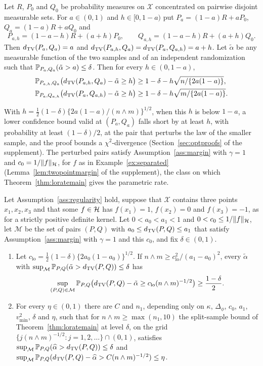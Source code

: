 \begin{proposition}
\label{prop:lower2pt}
Let $R$, $P_0$ and $Q_0$ be probability measures on $\mathcal X$ concentrated on pairwise disjoint measurable sets.
For $a\in(0,1)$ and $h\in[0,1-a)$ put $P_a=(1-a)R+aP_0$, $Q_a=(1-a)R+aQ_0$ and
\[
P_{a,h}=(1-a-h)R+(a+h)P_0,\qquad Q_{a,h}=(1-a-h)R+(a+h)Q_0 .
\]
Then $d_{\mathrm{TV}}(P_a,Q_a)=a$ and $d_{\mathrm{TV}}(P_{a,h},Q_a)=d_{\mathrm{TV}}(P_a,Q_{a,h})=a+h$. Let $\tilde\alpha$ be any measurable function of
the two samples and of an independent randomization such that $\mathbb{P}_{P_a,Q_a}(\tilde\alpha>a)\le\delta$. Then for every
$h\in(0,1-a)$,
\begin{align*}
\mathbb{P}_{P_{a,h},Q_a}\big(d_{\mathrm{TV}}(P_{a,h},Q_a)-\tilde\alpha\ge h\big)&\ge1-\delta-h\sqrt{n/\{2a(1-a)\}},\\
\mathbb{P}_{P_a,Q_{a,h}}\big(d_{\mathrm{TV}}(P_a,Q_{a,h})-\tilde\alpha\ge h\big)&\ge1-\delta-h\sqrt{m/\{2a(1-a)\}}.
\end{align*}
\end{proposition}

With $h=\tfrac12(1-\delta)\{2a(1-a)/(n\wedge m)\}^{1/2}$, when this $h$ is below $1-a$, a lower confidence bound
valid at $(P_a,Q_a)$ falls short by at least $h$, with probability at least $(1-\delta)/2$, at the pair that perturbs
the law of the smaller sample, and the proof bounds a $\chi^2$-divergence (Section~\ref{sec:optproofs} of the supplement).
The perturbed pairs satisfy Assumption~\ref{ass:margin} with $\gamma=1$ and $c_0=1/\|f\|_{\mathcal{H}}$, for $f$ as in
Example~\ref{ex:separated} (Lemma~\ref{lem:twopointmargin} of the supplement), the class on which
Theorem~\ref{thm:loratemain} gives the parametric rate.

\begin{corollary}
\label{cor:minimax}
Let Assumption~\ref{ass:regularity} hold, suppose that $\mathcal X$ contains three points $x_1,x_2,x_3$ and that some
$f\in\mathcal{H}$ has $f(x_1)=1$, $f(x_2)=0$ and $f(x_3)=-1$, as for a strictly positive definite kernel. Let
$0<a_0<a_1<1$ and $0<c_0\le1/\|f\|_{\mathcal{H}}$, let $\mathcal M$ be the set of pairs $(P,Q)$ with
$a_0\le d_{\mathrm{TV}}(P,Q)\le a_1$ that satisfy Assumption~\ref{ass:margin} with $\gamma=1$ and this $c_0$, and fix
$\delta\in(0,1)$.
\begin{enumerate}[label=(\roman*),leftmargin=*]
\item Let $c_{\mathrm{lo}}=\tfrac12(1-\delta)\{2a_0(1-a_0)\}^{1/2}$. If $n\wedge m\ge c_{\mathrm{lo}}^2/(a_1-a_0)^2$, every
$\tilde\alpha$ with $\sup_{\mathcal M}\mathbb{P}_{P,Q}(\tilde\alpha>d_{\mathrm{TV}}(P,Q))\le\delta$ has
\[
\sup_{(P,Q)\in\mathcal M}\mathbb{P}_{P,Q}\big(d_{\mathrm{TV}}(P,Q)-\tilde\alpha\ge c_{\mathrm{lo}}(n\wedge m)^{-1/2}\big)\ge\frac{1-\delta}2 .
\]
\item For every $\eta\in(0,1)$ there are $C$ and $n_1$, depending only on $\kappa$, $\Delta_\phi$, $c_0$, $a_1$,
$v^2_{\min}$, $\delta$ and $\eta$, such that for $n\wedge m\ge\max(n_1,10)$ the split-sample bound of
Theorem~\ref{thm:loratemain} at level $\delta$, on the grid $\{j(n\wedge m)^{-1/2}:j=1,2,\dots\}\cap(0,1)$, satisfies
$\sup_{\mathcal M}\mathbb{P}_{P,Q}(\widehat\alpha>d_{\mathrm{TV}}(P,Q))\le\delta$ and
$\sup_{\mathcal M}\mathbb{P}_{P,Q}(d_{\mathrm{TV}}(P,Q)-\widehat\alpha>C(n\wedge m)^{-1/2})\le\eta$.
\end{enumerate}
\end{corollary}

